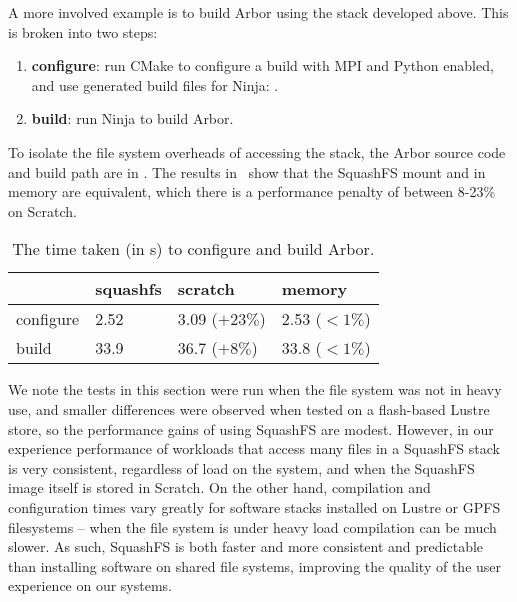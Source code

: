A more involved example is to build Arbor using the stack developed above.
This is broken into two steps:
\begin{enumerate}
    \item \textbf{configure}: run CMake to configure a build with MPI and Python enabled, and use generated build files for Ninja: .
    \item \textbf{build}: run Ninja to build Arbor.
\end{enumerate}

To isolate the file system overheads of accessing the stack, the Arbor source code and build path are in .
The results in~ show that the SquashFS mount and in memory are equivalent, which there is a performance penalty of between 8-23\% on Scratch.

\begin{table}[hp!]
    \begin{center}
        \begin{tabular}{l | l l l}
                        & squashfs & scratch & memory \\
                \hline
            configure   & 2.52    & 3.09 ($+23\%$)  & 2.53 ($<1\%$) \\
            build       & 33.9    & 36.7 ($+8\%$)   & 33.8 ($<1\%$) \\
        \end{tabular}
    \end{center}
    \caption{The time taken (in s) to configure and build Arbor.}
    \label{tbl:arbor-compile}
\end{table}


We note the tests in this section were run when the file system was not in heavy use, and smaller differences were observed when tested on a flash-based Lustre store, so the performance gains of using SquashFS are modest.
However, in our experience performance of workloads that access many files in a SquashFS stack is very consistent, regardless of load on the system, and when the SquashFS image itself is stored in Scratch.
On the other hand, compilation and configuration times vary greatly for software stacks installed on Lustre or GPFS filesystems -- when the file system is under heavy load compilation can be much slower.
As such, SquashFS is both faster and more consistent and predictable than installing software on shared file systems, improving the quality of the user experience on our systems.

